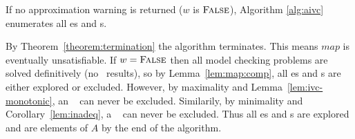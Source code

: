 \begin{theorem}
\label{theorem:aivc}
  If no approximation warning is returned ($w$ is $\textsc{False}$), Algorithm \ref{alg:aivc} enumerates all \mis es and \mivc s.
\end{theorem}

\begin{IEEEproof}
By Theorem~\ref{theorem:termination} the algorithm terminates. This
means $map$ is eventually unsatisfiable.  If $w = \textsc{False}$ then all model checking problems are solved definitively (no \unknown\ results), so by Lemma~\ref{lem:map:comp},
all \mis es and \mivc s are either explored or excluded.
However, by maximality and Lemma~\ref{lem:ivc-monotonic}, an \mis~ can never be
excluded. Similarily, by minimality and Corollary~\ref{lem:inadeq}, a
\mivc~ can never be excluded. Thus all \mis es and \mivc s are
explored and are elements of $A$ by the end of the algorithm.









%



\end{IEEEproof}
